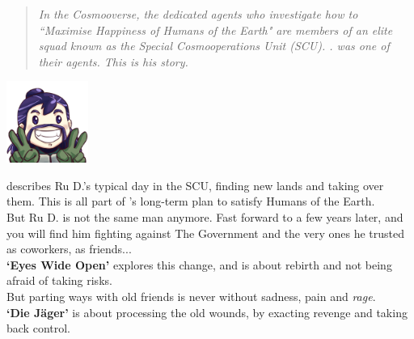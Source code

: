 

\begin{abstract}
\noindent
\emph{\normalsize{In the Cosmooverse, the dedicated agents who investigate how to ``Maximise Happiness of Humans of the Earth" are members of an elite squad known as the Special Cosmooperations Unit (SCU). . was one of their agents. This is his story.}}
\end{abstract}

\begin{center}
\includegraphics[width=0.2\textwidth]{Assets/happyD_512}
\end{center}

 describes Ru D.'s typical day in the SCU, finding new lands and taking over them. This is all part of 's long-term plan to satisfy Humans of the Earth.\\

But Ru D. is not the same man anymore. Fast forward to a few years later, and you will find him fighting against The Government and the very ones he trusted as coworkers, as friends...\\

\textbf{`Eyes Wide Open'} explores this change, and is about rebirth and not being afraid of taking risks. \\

But parting ways with old friends is never without sadness, pain and \emph{rage}.\\

\textbf{`Die Jäger'} is about processing the old wounds, by exacting revenge and taking back control.

\clearpage
